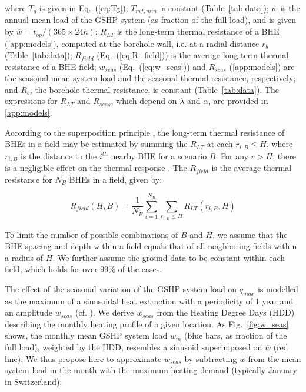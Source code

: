 where $T_g$ is given in Eq.~(\ref{eq:Tg}); $T_{mf, min}$ is constant (Table~\ref{tab:data});
$\overline{w}$ is the annual mean load of the GSHP system (as fraction of the full load), and is given by $\overline{w} = t_{op}/ (365 \times 24h)$;
$R_{LT}$ is the long-term thermal resistance of a BHE (\ref{app:models}), computed at the borehole wall, i.e. at a radial distance $r_b$ (Table~\ref{tab:data});
$R_{field}$ (Eq.~(\ref{eq:R_field})) is the average long-term thermal resistance of a BHE field; %
$w_{seas}$  (Eq.~(\ref{eq:w_seas})) and $R_{seas}$ (\ref{app:models}) are the seasonal mean system load %
and the seasonal thermal resistance, respectively; 
and $R_b$, the borehole thermal resistance, is constant (Table~\ref{tab:data}).
The expressions for $R_{LT}$ and $R_{seas}$, which depend on $\lambda$ and $\alpha$, are provided in \ref{app:models}. 

According to the superposition principle \cite{eskilson_thermal_1987}, the long-term thermal resistance of BHEs in a field may be estimated by summing 
the $R_{LT}$ at each $r_{i,B} \leq H$, where $r_{i,B}$ is the distance to the $i^{th}$ nearby BHE for a scenario $B$.
For any $r > H$, there is a negligible effect on the thermal response \cite{pahud_geothermal_2002}. 
The $R_{field}$ is the average thermal resistance for $N_B$ BHEs in a field, given by:

\begin{equation}
\label{eq:R_field}
    R_{field}(H, B) = \frac{1}{N_B} \sum_{i=1}^{N_B} \sum_{r_{i,B} \leq H} R_{LT}(r_{i,B}, H)
\end{equation}

To limit the number of possible combinations of $B$ and $H$, we assume that the BHE spacing and depth within a field equals that of all neighboring fields within a radius of $H$.
We further assume the ground data to be constant within each field, which holds for over 99\% of the cases. 

The effect of the seasonal variation of the GSHP system load on $q_{max}$ is modelled as the maximum of a sinusoidal heat extraction with a periodicity of 1 year and an amplitude $w_{seas}$ (cf. \cite{pahud_geothermal_2002}). 
We derive $w_{seas}$ from the Heating Degree Days (HDD) describing the monthly heating profile of a given location.
As Fig.~\ref{fig:w_seas} shows, the monthly mean GSHP system load $\overline{w}_m$ (blue bars, as fraction of the full load), weighted by the HDD, resembles a sinusoid superimposed on $\overline{w}$ (red line).
We thus propose here to approximate $w_{seas}$ by subtracting $\overline{w}$ from the mean system load in the month with the maximum heating demand (typically January in Switzerland):

